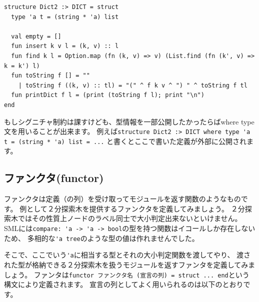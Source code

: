 \documentclass[11pt,a4paper]{article}
\begin{document}
\begin{lstlisting}[caption=リストによる辞書の実装,label=code:list-dict]
structure Dict2 :> DICT = struct
  type 'a t = (string * 'a) list

  val empty = []
  fun insert k v l = (k, v) :: l
  fun find k l = Option.map (fn (k, v) => v) (List.find (fn (k', v) => k = k') l)
  fun toString f [] = ""
    | toString f ((k, v) :: tl) = "(" ^ f k v ^ ") " ^ toString f tl
  fun printDict f l = (print (toString f l); print "\n")
end
\end{lstlisting}

もしシグニチャ制約は課すけども、型情報を一部公開したかったらばwhere type文を用いることが出来ます。
例えば\lstinline{structure Dict2 :> DICT where type 'a t = (string * 'a) list = ...}
と書くとここで書いた定義が外部に公開されます。

\subsection{ファンクタ(functor)}

ファンクタは定義（の列）を受け取ってモジュールを返す関数のようなものです。
例として２分探索木を提供するファンクタを定義してみましょう。
２分探索木ではその性質上ノードのラベル同士で大小判定出来ないといけません。
SMLには\lstinline{compare: 'a -> 'a -> bool}の型を持つ関数はイコールしか存在しないため、
多相的な\lstinline{'a tree}のような型の値は作れませんでした。

そこで、ここでいう\lstinline{'a}に相当する型とそれの大小判定関数を渡してやり、
渡された型が格納できる２分探索木を扱うモジュールを返すファンタを定義してみましょう。
ファンタは\lstinline{functor ファンクタ名 (宣言の列) = struct ... end}という構文により定義されます。
宣言の列としてよく用いられるのは以下のとおりです。
\end{document}
